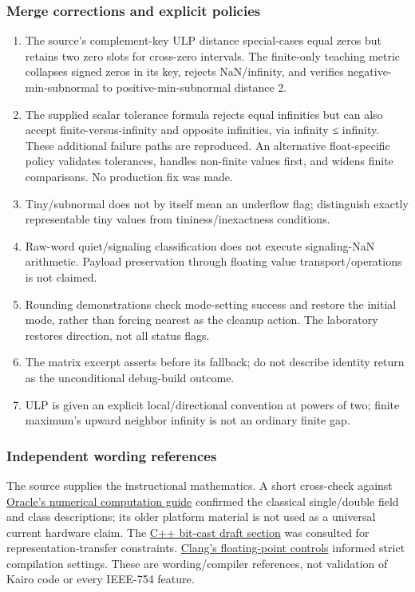\subsubsection{Merge corrections and explicit policies}\label{appendix-a103e7846d21-merge-corrections-and-explicit-policies}

\begin{enumerate}
\def\labelenumi{\arabic{enumi}.}
\tightlist
\item
  The source's complement-key ULP distance special-cases equal zeros but retains two zero slots for cross-zero intervals. The finite-only teaching metric collapses signed zeros in its key, rejects NaN/infinity, and verifies negative-min-subnormal to positive-min-subnormal distance 2.
\item
  The supplied scalar tolerance formula rejects equal infinities but can also accept finite-versus-infinity and opposite infinities, via infinity ≤ infinity. These additional failure paths are reproduced. An alternative float-specific policy validates tolerances, handles non-finite values first, and widens finite comparisons. No production fix was made.
\item
  Tiny/subnormal does not by itself mean an underflow flag; distinguish exactly representable tiny values from tininess/inexactness conditions.
\item
  Raw-word quiet/signaling classification does not execute signaling-NaN arithmetic. Payload preservation through floating value transport/operations is not claimed.
\item
  Rounding demonstrations check mode-setting success and restore the initial mode, rather than forcing nearest as the cleanup action. The laboratory restores direction, not all status flags.
\item
  The matrix excerpt asserts before its fallback; do not describe identity return as the unconditional debug-build outcome.
\item
  ULP is given an explicit local/directional convention at powers of two; finite maximum's upward neighbor infinity is not an ordinary finite gap.
\end{enumerate}

\subsubsection{Independent wording references}\label{appendix-a103e7846d21-independent-wording-references}

The source supplies the instructional mathematics. A short cross-check against \href{https://docs.oracle.com/cd/E19957-01/806-3568/ncg_math.html}{Oracle's numerical computation guide} confirmed the classical single/double field and class descriptions; its older platform material is not used as a universal current hardware claim. The \href{https://eel.is/c++draft/bit.cast}{C++ bit-cast draft section} was consulted for representation-transfer constraints. \href{https://clang.llvm.org/docs/UsersManual.html\#controlling-floating-point-behavior}{Clang's floating-point controls} informed strict compilation settings. These are wording/compiler references, not validation of Kairo code or every IEEE-754 feature.

